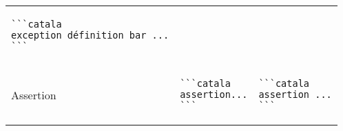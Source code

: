 \documentclass[a3paper,landscape]{article}
\begin{document}
\begin{multicols*}{2}
\begin{center}
\begin{tabular}{p{}p{}p{}}
\begin{verbatim}
```catala
exception définition bar ...
```
\end{verbatim}
      \vspace*{-1.75em}
      \\
      Assertion                               &
      \vspace*{-1.75em}
      \begin{verbatim}
```catala
assertion...
```
\end{verbatim}
      \vspace*{-1.75em}
                                              &
      \vspace*{-1.75em}
      \begin{verbatim}
```catala
assertion ...
```
\end{verbatim}
      \vspace*{-1.75em}
      \\
      \bottomrule
    \end{tabular}
  \end{center}






\end{multicols*}
\end{document}
